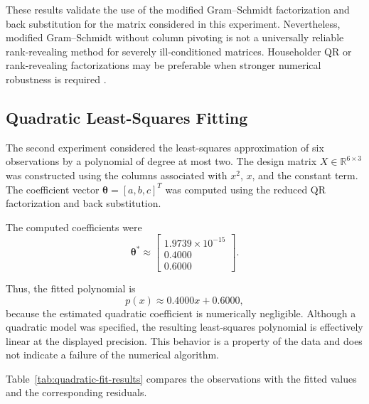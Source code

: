 These results validate the use of the modified Gram--Schmidt
factorization and back substitution for the matrix considered in
this experiment. Nevertheless, modified Gram--Schmidt without
column pivoting is not a universally reliable rank-revealing
method for severely ill-conditioned matrices. Householder QR
or rank-revealing factorizations may be preferable when stronger
numerical robustness is required
\cite{golub2013matrix,higham2002accuracy}.

\subsection{Quadratic Least-Squares Fitting}
\label{subsec:quadratic-fitting}

The second experiment considered the least-squares approximation
of six observations by a polynomial of degree at most two.
The design matrix $X\in\mathbb{R}^{6\times3}$ was constructed
using the columns associated with $x^2$, $x$, and the constant
term. The coefficient vector
$\boldsymbol{\theta}=[a,b,c]^T$ was computed using the reduced
QR factorization and back substitution.

The computed coefficients were
\begin{equation}
    \boldsymbol{\theta}^{*}\approx
    \begin{bmatrix}
        1.9739\times10^{-15} \\
        0.4000               \\
        0.6000
    \end{bmatrix}.
    \label{eq:quadratic-coefficients}
\end{equation}

Thus, the fitted polynomial is
\begin{equation}
    p(x)\approx 0.4000x+0.6000,
    \label{eq:fitted-polynomial}
\end{equation}
because the estimated quadratic coefficient is numerically
negligible. Although a quadratic model was specified, the resulting
least-squares polynomial is effectively linear at the displayed
precision. This behavior is a property of the data and does not
indicate a failure of the numerical algorithm.

Table~\ref{tab:quadratic-fit-results} compares the observations
with the fitted values and the corresponding residuals.

